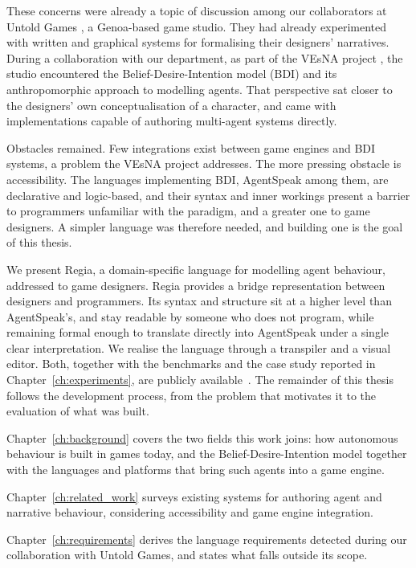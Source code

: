 These concerns were already a topic of discussion among our collaborators at Untold Games \cite{UntoldGames}, a Genoa-based game studio. They had already experimented with written and graphical systems for formalising their designers' narratives. During a collaboration with our department, as part of the VEsNA project \cite{Gatti2026Pro}, the studio encountered the Belief-Desire-Intention model (BDI) and its anthropomorphic approach to modelling agents. That perspective sat closer to the designers' own conceptualisation of a character, and came with implementations capable of authoring multi-agent systems directly.
 
Obstacles remained. Few integrations exist between game engines and BDI systems, a problem the VEsNA project addresses. The more pressing obstacle is accessibility. The languages implementing BDI, AgentSpeak among them, are declarative and logic-based, and their syntax and inner workings present a barrier to programmers unfamiliar with the paradigm, and a greater one to game designers. A simpler language was therefore needed, and building one is the goal of this thesis.
 
We present Regia, a domain-specific language for modelling agent behaviour, addressed to game designers. Regia provides a bridge representation between designers and programmers. Its syntax and structure sit at a higher level than AgentSpeak's, and stay readable by someone who does not program, while remaining formal enough to translate directly into AgentSpeak under a single clear interpretation. We realise the language through a transpiler and a visual editor. Both, together with the benchmarks and the case study reported in Chapter~\ref{ch:experiments}, are publicly available~\cite{RegiaRepo}. The remainder of this thesis follows the development process, from the problem that motivates it to the evaluation of what was built.

Chapter~\ref{ch:background} covers the two fields this work joins: how autonomous behaviour is built in games today, and the Belief-Desire-Intention model together with the languages and platforms that bring such agents into a game engine.

Chapter~\ref{ch:related_work} surveys existing systems for authoring agent and narrative behaviour, considering accessibility and game engine integration.

Chapter~\ref{ch:requirements} derives the language requirements detected during our collaboration with Untold Games, and states what falls outside its scope.

